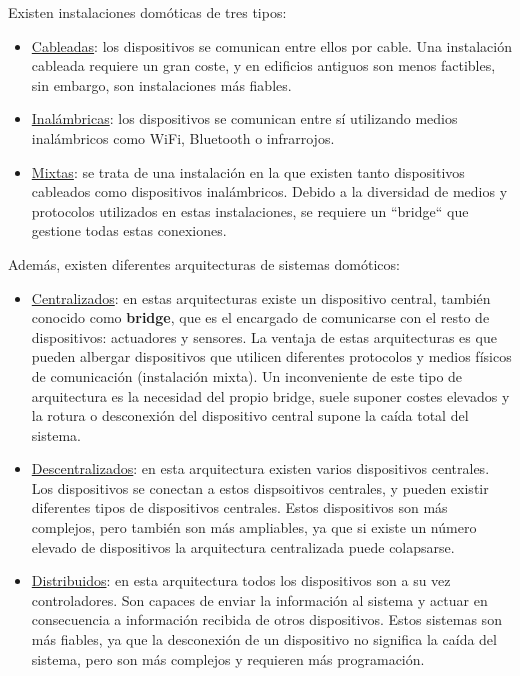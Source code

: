 
\par
Existen instalaciones domóticas de tres tipos:
\begin{itemize}
\item\underline{Cableadas}: los dispositivos se comunican entre ellos por cable. Una instalación cableada requiere un gran coste, y en edificios antiguos 
son menos factibles, sin embargo, son instalaciones más fiables.
\item\underline{Inalámbricas}: los dispositivos se comunican entre sí utilizando medios inalámbricos como WiFi, Bluetooth o infrarrojos.
\item\underline{Mixtas}: se trata de una instalación en la que existen tanto dispositivos cableados como dispositivos inalámbricos. Debido a la diversidad
de medios y protocolos utilizados en estas instalaciones, se requiere un ``bridge`` que gestione todas estas conexiones.
\end{itemize}

Además, existen diferentes arquitecturas de sistemas domóticos:
\begin{itemize}
\item\underline{Centralizados}: en estas arquitecturas existe un dispositivo central, también conocido como \textbf{bridge}, que es el encargado
de comunicarse con el resto de dispositivos: actuadores y sensores. La ventaja de estas arquitecturas es que pueden albergar dispositivos que utilicen
diferentes protocolos y medios físicos de comunicación (instalación mixta). Un inconveniente de este tipo de arquitectura es la necesidad del
 propio bridge, suele suponer costes elevados y la rotura o desconexión del dispositivo central supone la caída total del sistema.
\item\underline{Descentralizados}: en esta arquitectura existen varios dispositivos centrales. Los dispositivos se conectan a estos dispsoitivos centrales, 
y pueden existir diferentes tipos de dispositivos centrales. Estos dispositivos son más complejos, pero también son más ampliables, ya que si existe
un número elevado de dispositivos la arquitectura centralizada puede colapsarse.
\item\underline{Distribuidos}: en esta arquitectura todos los dispositivos son a su vez controladores. Son capaces de enviar la información al sistema y actuar 
en consecuencia a información recibida de otros dispositivos. Estos sistemas son más fiables, ya que la desconexión de un dispositivo no significa 
la caída del sistema, pero son más complejos y requieren más programación.
\end{itemize}


